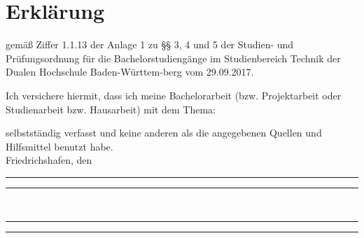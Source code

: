 \chapter*{Erklärung}

gemäß Ziffer 1.1.13 der Anlage 1 zu §§ 3, 4 und 5 der Studien- und Prüfungsordnung für die Bachelorstudiengänge im Studienbereich Technik der Dualen Hochschule Baden-Württem-berg vom 29.09.2017.

Ich versichere hiermit, dass ich meine Bachelorarbeit (bzw. Projektarbeit oder Studienarbeit bzw. Hausarbeit) mit dem Thema: 

\begin{quote}
    \textit{\titel}
\end{quote}

selbstständig verfasst und keine anderen als die angegebenen Quellen und Hilfsmittel benutzt habe.\\[2ex]

Friedrichshafen, den \datum\\[1ex]

\rule[-0.2cm]{5cm}{0.5pt} 
\hspace{1.5cm}
\rule[-0.2cm]{5cm}{0.5pt} \\

\rule[-0.2cm]{5cm}{0.5pt} 
\hspace{1.5cm}
\rule[-0.2cm]{5cm}{0.5pt} \\

\autor  

\clearpage